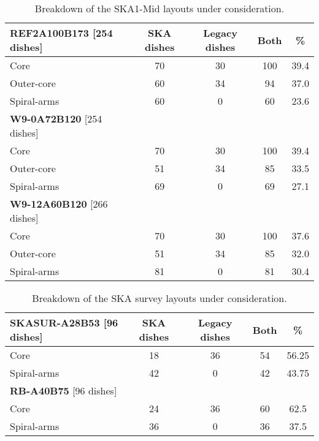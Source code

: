 \documentclass[sfheadings,a4paper,times,9pt,floats,floatfix]{article}
\begin{document}
\begin{table}[H]
\centering
 \tiny{
 \begin{tabular}{l|cccc}\hline
 {\bf REF2A100B173} [254 dishes] & SKA dishes&  Legacy dishes & Both & \% \\\hline\hline
  Core & 70 & 30 & 100 & 39.4 \\
 Outer-core & 60 & 34 & 94 & 37.0 \\
 Spiral-arms & 60 & 0 & 60 & 23.6 \\\hline\hline
  {\bf W9-0A72B120} [254 dishes] &  & &  & \\\hline\hline
  Core & 70 & 30 & 100 & 39.4 \\
 Outer-core & 51 & 34 & 85 & 33.5 \\
 Spiral-arms & 69 & 0 & 69 & 27.1 \\\hline\hline
  {\bf W9-12A60B120} [266 dishes] &  & &  & \\\hline\hline
  Core & 70 & 30 & 100 & 37.6 \\
 Outer-core & 51 & 34 & 85 & 32.0 \\
 Spiral-arms & 81 & 0 & 81 & 30.4 \\\hline\hline
  \end{tabular}}
 \caption{Breakdown of the SKA1-Mid layouts under consideration.}\label{tab:lay}
\end{table}

\begin{table}[H]
\centering
 \tiny{
 \begin{tabular}{l|cccc}\hline
 {\bf SKASUR-A28B53} [96 dishes] & SKA dishes&  Legacy dishes & Both & \% \\\hline\hline
 Core & 18 & 36 & 54 & 56.25 \\
 Spiral-arms & 42 & 0 & 42 & 43.75 \\\hline\hline
 {\bf RB-A40B75} [96 dishes] &  & &  & \\\hline\hline
 Core & 24 & 36 & 60 & 62.5 \\
 Spiral-arms & 36 & 0 & 36 & 37.5 \\\hline\hline
 \end{tabular}}
 \caption{Breakdown of the SKA survey layouts under consideration.}\label{tab:lay}
\end{table}
\end{document}
